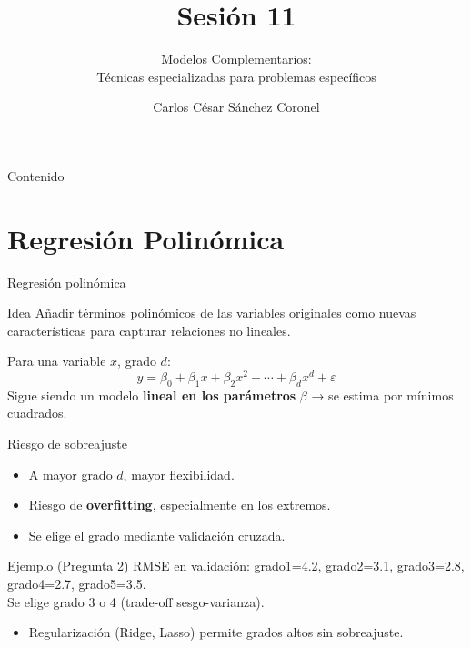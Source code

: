 \documentclass[aspectratio=169, 10pt, xcolor=table]{beamer}
\title[SESIÓN 11]{\textbf{Sesión 11}}
\subtitle{Modelos Complementarios: \\ Técnicas especializadas para problemas específicos}
\author[Prof. C. Sánchez]{Carlos César Sánchez Coronel}
\institute{\textbf{MACHINE LEARNING}}
\date{}
\begin{document}
\begin{frame}
    \titlepage
\end{frame}

\begin{frame}{Contenido}
    \tableofcontents
\end{frame}

\section{Regresión Polinómica}

\begin{frame}{Regresión polinómica}
    \begin{block}{Idea}
        Añadir términos polinómicos de las variables originales como nuevas características para capturar relaciones no lineales.
    \end{block}
    Para una variable $x$, grado $d$:
    \[
    y = \beta_0 + \beta_1 x + \beta_2 x^2 + \cdots + \beta_d x^d + \varepsilon
    \]
    Sigue siendo un modelo \textbf{lineal en los parámetros} $\beta$ → se estima por mínimos cuadrados.
\end{frame}

\begin{frame}{Riesgo de sobreajuste}
    \begin{itemize}
        \item A mayor grado $d$, mayor flexibilidad.
        \item Riesgo de \textbf{overfitting}, especialmente en los extremos.
        \item Se elige el grado mediante validación cruzada.
    \end{itemize}
    \begin{exampleblock}{Ejemplo (Pregunta 2)}
        RMSE en validación: grado1=4.2, grado2=3.1, grado3=2.8, grado4=2.7, grado5=3.5.\\
        Se elige grado 3 o 4 (trade-off sesgo-varianza).
    \end{exampleblock}
    \begin{itemize}
        \item Regularización (Ridge, Lasso) permite grados altos sin sobreajuste.
    \end{itemize}
\end{frame}
\end{document}
